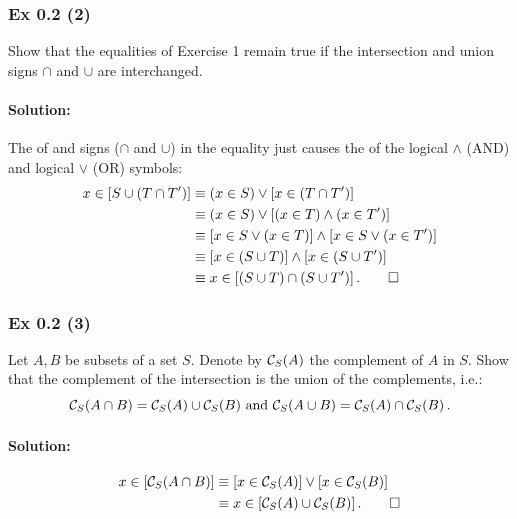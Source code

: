 \subsubsection{Ex 0.2 (2)}\label{sec:Ex_0.2.2}
Show that the equalities of Exercise 1 remain true if the intersection and union signs $\cap$ and $\cup$ are interchanged.

\paragraph{Solution:}{
The  of  and  signs ($\cap$ and $\cup$) in the equality 
just causes the  of the logical $\land$ (AND) and logical $\lor$ (OR) symbols:
\begin{align*}
x \in \left[ S \cup (T \cap T') \right] &\equiv  (x \in S) \lor [x \in (T \cap T')]\\
                                        &\equiv  (x \in S) \lor [(x \in T) \land (x \in T')] \\
                                        &\equiv  [x \in S \lor (x \in T)] \land [x \in S \lor (x \in T')]\\
                                        &\equiv  [x \in (S \cup T)] \land [x \in (S \cup T')]\\
                                        &\equiv  x \in [(S \cup T) \cap (S \cup T')]\,. \qed
\end{align*}
}	%

\subsubsection{Ex 0.2 (3)}\label{sec:Ex_0.2.3}
Let $A, B$ be subsets of a set $S$. Denote by $\mathcal{C}_S(A)$ the complement of $A$ in $S$. Show that the complement of the intersection is the union of the complements, i.e.:
$$\mathcal{C}_S(A \cap B) = \mathcal{C}_S(A) \cup \mathcal{C}_S(B) \text{   and   } \mathcal{C}_S(A \cup B) = \mathcal{C}_S(A) \cap \mathcal{C}_S(B)\,.$$ 

\paragraph{Solution:}{

\begin{align*}
x \in \left[ \mathcal{C}_S(A \cap B) \right] &\equiv  [x \in \mathcal{C}_S(A)] \lor [x \in \mathcal{C}_S(B)] \\ 
                                     &\equiv  x \in [\mathcal{C}_S(A) \cup \mathcal{C}_S(B)]\,. \qed
\end{align*}

}	%

